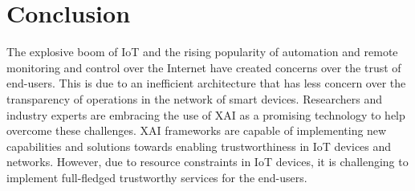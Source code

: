 \documentclass[journal]{IEEEtran}
\begin{document}
\section{Conclusion}
\label{sec:conclusion}

The explosive boom of IoT and the rising popularity of automation and remote monitoring and control over the Internet have created concerns over the trust of end-users. This is due to an inefficient architecture that has less concern over the transparency of operations in the network of smart devices. Researchers and industry experts are embracing the use of XAI as a promising technology to help overcome these challenges. XAI frameworks are capable of implementing new capabilities and solutions towards enabling trustworthiness in IoT devices and networks. However, due to resource constraints in IoT devices, it is challenging to implement full-fledged trustworthy services for the end-users. 
\end{document}

